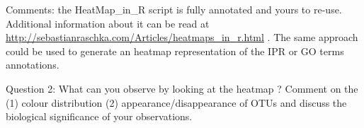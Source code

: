 \documentclass[a4paper,12pt,twoside]{memoir}
\begin{document}
\begin{note}
Comments: the HeatMap\_in\_R script is fully annotated and yours to re-use. Additional information about it can be read at \url{http://sebastianraschka.com/Articles/heatmaps\_in\_r.html} . The same approach could be used to generate an heatmap representation of the IPR or GO terms annotations.
\end{note}

\begin{questions}
Question 2: What can you observe by looking at the heatmap ? Comment on the (1) colour distribution (2) appearance/disappearance of OTUs and discuss the biological significance of your observations.
\begin{answer}

\end{answer}
\end{questions}
\end{document}

